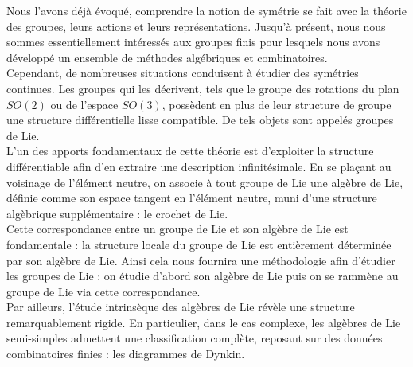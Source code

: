 Nous l'avons déjà évoqué, comprendre la notion de symétrie se fait avec la théorie des groupes, leurs actions et leurs représentations. Jusqu'à présent, nous nous sommes essentiellement intéressés aux groupes finis pour lesquels nous avons développé un ensemble de méthodes algébriques et combinatoires. \\

Cependant, de nombreuses situations conduisent à étudier des symétries continues. Les groupes qui les décrivent, tels que le groupe des rotations du plan $SO(2)$ ou de l'espace $SO(3)$, possèdent en plus de leur structure de groupe une structure différentielle lisse compatible. De tels objets sont appelés groupes de Lie.  \\

L'un des apports fondamentaux de cette théorie est d'exploiter la structure différentiable afin d'en extraire une description infinitésimale. En se plaçant au voisinage de l'élément neutre, on associe à tout groupe de Lie une algèbre de Lie, définie comme son espace tangent en l'élément neutre, muni d'une structure algèbrique supplémentaire : le crochet de Lie. \\

Cette correspondance entre un groupe de Lie et son algèbre de Lie est fondamentale : la structure locale du groupe de Lie est entièrement déterminée par son algèbre de Lie. Ainsi cela nous fournira une méthodologie afin d'étudier les groupes de Lie : on étudie d'abord son algèbre de Lie puis on se rammène au groupe de Lie via cette correspondance. \\

Par ailleurs, l’étude intrinsèque des algèbres de Lie révèle une structure remarquablement rigide. En particulier, dans le cas complexe, les algèbres de Lie semi-simples admettent une classification complète, reposant sur des données combinatoires finies : les diagrammes de Dynkin.